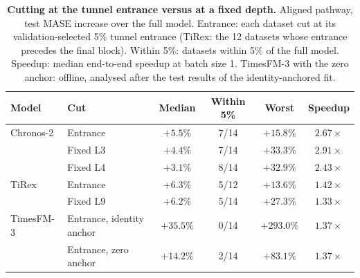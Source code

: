 \begin{table}[t]
\centering
\caption{\textbf{Cutting at the tunnel entrance versus at a fixed depth.} Aligned pathway, test MASE increase over the full model. Entrance: each dataset cut at its validation-selected 5\% tunnel entrance (TiRex: the 12 datasets whose entrance precedes the final block). Within 5\%: datasets within 5\% of the full model. Speedup: median end-to-end speedup at batch size 1. TimesFM-3 with the zero anchor: offline, analysed after the test results of the identity-anchored fit.}
\vspace{4pt}
\label{tab:entrance_rule}
\small
\setlength{\tabcolsep}{5pt}
\begin{tabular}{@{}llcccc@{}}
\toprule
Model & Cut & Median & Within 5\% & Worst & Speedup \\
\midrule
Chronos-2 & Entrance & $+5.5\%$ & 7/14 & $+15.8\%$ & $2.67\times$ \\
 & Fixed L3 & $+4.4\%$ & 7/14 & $+33.3\%$ & $2.91\times$ \\
 & Fixed L4 & $+3.1\%$ & 8/14 & $+32.9\%$ & $2.43\times$ \\
\midrule
TiRex & Entrance & $+6.3\%$ & 5/12 & $+13.6\%$ & $1.42\times$ \\
 & Fixed L9 & $+6.2\%$ & 5/14 & $+27.3\%$ & $1.33\times$ \\
\midrule
TimesFM-3 & Entrance, identity anchor & $+35.5\%$ & 0/14 & $+293.0\%$ & $1.37\times$ \\
 & Entrance, zero anchor & $+14.2\%$ & 2/14 & $+83.1\%$ & $1.37\times$ \\
\bottomrule
\end{tabular}
\end{table}
